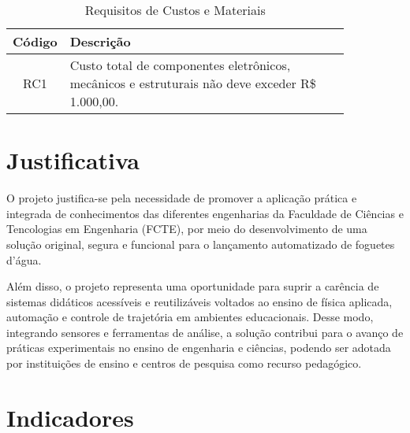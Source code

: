 \begin{samepage}
\begin{table}[htpb]
\centering
\scriptsize
\setlength{\tabcolsep}{4pt}
\caption{Requisitos de Custos e Materiais}
\begin{tabular}{|c|p{0.85\linewidth}|}
\hline
\textbf{Código} & \textbf{Descrição} \\
\hline
RC1 & Custo total de componentes eletrônicos, mecânicos e estruturais não deve exceder R\$ 1.000,00. \\
\hline
\end{tabular}
\label{tab:requisitos-custos}
\end{table}
\end{samepage}

\section{Justificativa}

O projeto justifica-se pela necessidade de promover a aplicação prática e integrada de conhecimentos das diferentes engenharias da Faculdade de Ciências e Tencologias em Engenharia (FCTE), por meio do desenvolvimento de uma solução original, segura e funcional para o lançamento automatizado de foguetes d’água. 

Além disso, o projeto representa uma oportunidade para suprir a carência de sistemas didáticos acessíveis e reutilizáveis voltados ao ensino de física aplicada, automação e controle de trajetória em ambientes educacionais. Desse modo, integrando sensores e ferramentas de análise, a solução contribui para o avanço de práticas experimentais no ensino de engenharia e ciências, podendo ser adotada por instituições de ensino e centros de pesquisa como recurso pedagógico. 



\section{Indicadores}

